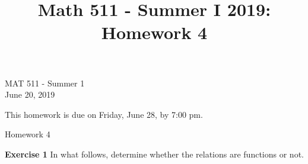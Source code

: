 \documentclass[12pt,oneside]{exam}
\title{Math 511 - Summer I 2019: Homework 4}
\newenvironment{exercise}[1]{\vspace{.1in}\noindent\textbf{Exercise #1 \hspace{.05em}}}{}
\newcommand{\N}{\mathbb{N}}
\begin{document}
\begin{flushright}
\sc MAT 511 - Summer 1\\
June 20, 2019
\end{flushright}
\bigskip

This homework is due on Friday, June 28, by 7:00 pm. 
\begin{center}
\textsf{Homework 4} 
\end{center}


\begin{exercise}{1}
In what follows, determine whether the relations are functions or not.
\end{exercise}
\end{document}
